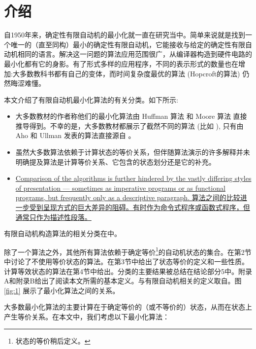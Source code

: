 

\chapter{介绍}

自1950年来，确定性有限自动机的最小化就一直在研究当中。简单来说就是找到一个唯一的（直至同构）最小的确定性有限自动机，它能接收与给定的确定性有限自动机相同的语言。解决这一问题的算法应用范围很广，从编译器构造到硬件电路的最小化都有它的身影。有了形式多样的应用程序，不同的表示形式的数量也在增加:大多数教科书都有自己的变体，而时间复杂度最优的算法 (Hopcroft的算法) 仍然晦涩难懂。

本文介绍了有限自动机最小化算法的有关分类。如下所示:

\begin{itemize}
    \item 大多数教材的作者称他们的最小化算法由 Huffman 算法 \cite{Huff54} 和 Moore 算法 \cite{Moor56} 直接推导得到。不幸的是，大多数教材都展示了截然不同的算法 (比如 \cite{AU92,ASU86,Hu79,Wood87}), 只有由 Aho 和 Ullman 发表的算法直接源自 \cite{Huff54, Moor56}。
    \item 虽然大多数算法依赖于计算状态的等价关系，但伴随算法演示的许多解释并未明确提及算法是计算等价关系、它包含的状态划分还是它的补充。
    \item \uline {Comparison of the algorithms is further hindered by the vastly differing styles of presentation --- sometimes as imperative programs or as functional programs, but frequently only as a descriptive paragraph. 算法之间的比较进一步受到呈现方式的巨大差异的阻碍。有时作为命令式程序或函数式程序，但通常只作为描述性段落。}
\end{itemize}

有限自动机构造算法的相关分类在\cite{Wats93}中。

除了一个算法之外，其他所有算法依赖于确定等价\footnote{状态的等价稍后定义。}的自动机状态的集合。在第2节中讨论了不使用等价状态的算法。在第3节中给出了状态等价的定义和一些性质。计算等效状态的算法在第4节中给出。分类的主要结果被总结在结论部分5中。附录A和附录B给出了阅读本文所需的基本定义。与有限自动机相关的定义取自\cite{Wats93}。图 \ref{fig:1} 展示了最小化算法之间的关系。

大多数最小化算法的主要计算在于确定等价的（或不等价的）状态，从而在状态上产生等价关系。在本文中，我们考虑以下最小化算法：

